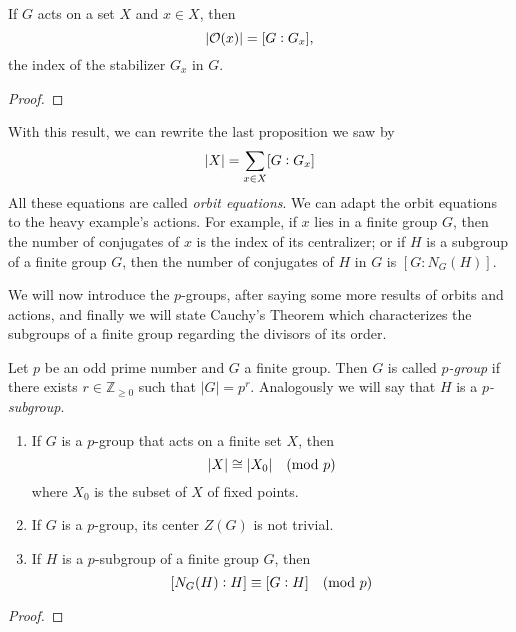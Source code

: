 \documentclass[../main.tex]{subfiles}
\begin{document}
\begin{ter}
If $G$ acts on a set $X$ and $x\in X$, then
\begin{equation}
    \notag
    |\mathcal{O}(x)| = [G:G_x],
\end{equation}
the index of the stabilizer $G_x$ in $G$.
\end{ter}
\begin{proof}
\noproof
\end{proof}

With this result, we can rewrite the last proposition we saw by
\begin{equation}
    \notag
    |X| = \sum_{x\in X}[G:G_x]
\end{equation}
All these equations are called \textit{orbit equations}. We can adapt the orbit equations to the heavy example's actions. For example, if $x$ lies in a finite group $G$, then the number of conjugates of $x$ is the index of its centralizer; or if $H$ is a subgroup of a finite group $G$, then the number of conjugates of $H$ in $G$ is $[G:N_G(H)]$.

We will now introduce the $p$-groups, after saying some more results of orbits and actions, and finally we will state Cauchy's Theorem which characterizes the subgroups of a finite group regarding the divisors of its order.

\begin{defi}
[$p$-group] Let $p$ be an odd prime number and $G$ a finite group. Then $G$ is called \textit{$p$-group} if there exists $r\in\mathbb{Z}_{\geq 0}$ such that $|G| = p^r$. Analogously we will say that $H$ is a \textit{$p$-subgroup}.
\end{defi}


\begin{prop}
\begin{enumerate}[(1)]
    \item If $G$ is a $p$-group that acts on a finite set $X$, then
    \begin{equation}
        \notag
        |X|\cong |X_0|\quad \text{(mod $p$)}
    \end{equation}
    where $X_0$ is the subset of $X$ of fixed points.
    \item If $G$ is a $p$-group, its center $Z(G)$ is not trivial.
    \item If $H$ is a $p$-subgroup of a finite group $G$, then
    \begin{equation}
        \notag
        [N_G(H):H]\equiv[G:H]\quad\text{(mod $p$)}
    \end{equation}
\end{enumerate}
\end{prop}
\begin{proof}
\noproof
\end{proof}
\end{document}
